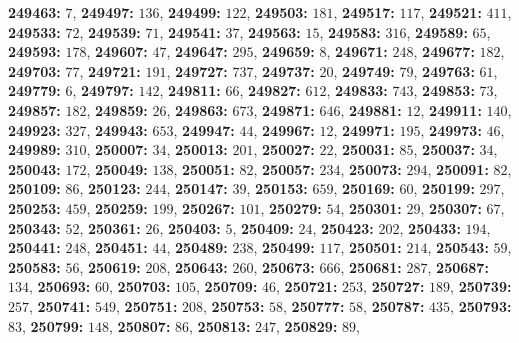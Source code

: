 \textsf{\bfseries 249463:} $7$, \textsf{\bfseries 249497:} $136$, \textsf{\bfseries 249499:} $122$, \textsf{\bfseries 249503:} $181$, \textsf{\bfseries 249517:} $117$, \textsf{\bfseries 249521:} $411$, \textsf{\bfseries 249533:} $72$, \textsf{\bfseries 249539:} $71$, \textsf{\bfseries 249541:} $37$, \textsf{\bfseries 249563:} $15$, \textsf{\bfseries 249583:} $316$, \textsf{\bfseries 249589:} $65$, \textsf{\bfseries 249593:} $178$, \textsf{\bfseries 249607:} $47$, \textsf{\bfseries 249647:} $295$, \textsf{\bfseries 249659:} $8$, \textsf{\bfseries 249671:} $248$, \textsf{\bfseries 249677:} $182$, \textsf{\bfseries 249703:} $77$, \textsf{\bfseries 249721:} $191$, \textsf{\bfseries 249727:} $737$, \textsf{\bfseries 249737:} $20$, \textsf{\bfseries 249749:} $79$, \textsf{\bfseries 249763:} $61$, \textsf{\bfseries 249779:} $6$, \textsf{\bfseries 249797:} $142$, \textsf{\bfseries 249811:} $66$, \textsf{\bfseries 249827:} $612$, \textsf{\bfseries 249833:} $743$, \textsf{\bfseries 249853:} $73$, \textsf{\bfseries 249857:} $182$, \textsf{\bfseries 249859:} $26$, \textsf{\bfseries 249863:} $673$, \textsf{\bfseries 249871:} $646$, \textsf{\bfseries 249881:} $12$, \textsf{\bfseries 249911:} $140$, \textsf{\bfseries 249923:} $327$, \textsf{\bfseries 249943:} $653$, \textsf{\bfseries 249947:} $44$, \textsf{\bfseries 249967:} $12$, \textsf{\bfseries 249971:} $195$, \textsf{\bfseries 249973:} $46$, \textsf{\bfseries 249989:} $310$, \textsf{\bfseries 250007:} $34$, \textsf{\bfseries 250013:} $201$, \textsf{\bfseries 250027:} $22$, \textsf{\bfseries 250031:} $85$, \textsf{\bfseries 250037:} $34$, \textsf{\bfseries 250043:} $172$, \textsf{\bfseries 250049:} $138$, \textsf{\bfseries 250051:} $82$, \textsf{\bfseries 250057:} $234$, \textsf{\bfseries 250073:} $294$, \textsf{\bfseries 250091:} $82$, \textsf{\bfseries 250109:} $86$, \textsf{\bfseries 250123:} $244$, \textsf{\bfseries 250147:} $39$, \textsf{\bfseries 250153:} $659$, \textsf{\bfseries 250169:} $60$, \textsf{\bfseries 250199:} $297$, \textsf{\bfseries 250253:} $459$, \textsf{\bfseries 250259:} $199$, \textsf{\bfseries 250267:} $101$, \textsf{\bfseries 250279:} $54$, \textsf{\bfseries 250301:} $29$, \textsf{\bfseries 250307:} $67$, \textsf{\bfseries 250343:} $52$, \textsf{\bfseries 250361:} $26$, \textsf{\bfseries 250403:} $5$, \textsf{\bfseries 250409:} $24$, \textsf{\bfseries 250423:} $202$, \textsf{\bfseries 250433:} $194$, \textsf{\bfseries 250441:} $248$, \textsf{\bfseries 250451:} $44$, \textsf{\bfseries 250489:} $238$, \textsf{\bfseries 250499:} $117$, \textsf{\bfseries 250501:} $214$, \textsf{\bfseries 250543:} $59$, \textsf{\bfseries 250583:} $56$, \textsf{\bfseries 250619:} $208$, \textsf{\bfseries 250643:} $260$, \textsf{\bfseries 250673:} $666$, \textsf{\bfseries 250681:} $287$, \textsf{\bfseries 250687:} $134$, \textsf{\bfseries 250693:} $60$, \textsf{\bfseries 250703:} $105$, \textsf{\bfseries 250709:} $46$, \textsf{\bfseries 250721:} $253$, \textsf{\bfseries 250727:} $189$, \textsf{\bfseries 250739:} $257$, \textsf{\bfseries 250741:} $549$, \textsf{\bfseries 250751:} $208$, \textsf{\bfseries 250753:} $58$, \textsf{\bfseries 250777:} $58$, \textsf{\bfseries 250787:} $435$, \textsf{\bfseries 250793:} $83$, \textsf{\bfseries 250799:} $148$, \textsf{\bfseries 250807:} $86$, \textsf{\bfseries 250813:} $247$, \textsf{\bfseries 250829:} $89$, 
